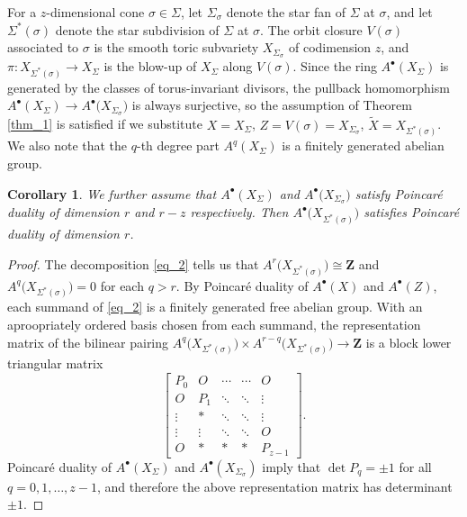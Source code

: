\documentclass[a4paper,final,oneside]{amsart}
\theoremstyle{definition}
\theoremstyle{plain}
\newtheorem{corollary}[definition]{Corollary}
\theoremstyle{remark}
\begin{document}
For a \(z\)-dimensional cone \(\sigma \in \Sigma\), let \(\Sigma_{\sigma}\) denote the star fan of \(\Sigma\) at \(\sigma\), and let \(\Sigma^*(\sigma)\) denote the star subdivision of \(\Sigma\) at \(\sigma\).
The orbit closure \(V(\sigma)\) associated to \(\sigma\) is the smooth toric subvariety \(X_{\Sigma_{\sigma}}\) of codimension \(z\), and \(\pi\colon X_{\Sigma^*(\sigma)}\to X_{\Sigma}\) is the blow-up of \(X_{\Sigma}\) along \(V(\sigma)\).
Since the ring \(A^{\bullet}(X_{\Sigma})\) is generated by the classes of torus-invariant divisors, the pullback homomorphism \(A^{\bullet}(X_{\Sigma}) \to A^{\bullet}\big(X_{\Sigma_{\sigma}}\big)\) is always surjective, so the assumption of Theorem \ref{thm_1} is satisfied if we substitute \(X=X_{\Sigma}\), \(Z=V(\sigma)=X_{\Sigma_{\sigma}}\), \(\widetilde{X}=X_{\Sigma^*(\sigma)}\).
We also note that the \(q\)-th degree part \(A^q(X_{\Sigma})\) is a finitely generated abelian group.
\begin{corollary}\label{cor_1}
We further assume that \(A^{\bullet}(X_{\Sigma})\) and \(A^{\bullet}\big(X_{\Sigma_{\sigma}}\big)\) satisfy Poincar\'e duality of dimension \(r\) and \(r-z\) respectively.
Then \(A^{\bullet}\big(X_{\Sigma^*(\sigma)}\big)\) satisfies Poincar\'e duality of dimension \(r\).
\end{corollary}
\begin{proof}
The decomposition \eqref{eq_2} tells us that \(A^r\big(X_{\Sigma^*(\sigma)}\big)\cong \symbf{Z}\) and \(A^q\big(X_{\Sigma^*(\sigma)}\big)=0\) for each \(q>r\).
By Poincar\'e duality of \(A^{\bullet}(X)\) and \(A^{\bullet}(Z)\), each summand of \eqref{eq_2} is a finitely generated free abelian group.
With an aproopriately ordered basis chosen from each summand, the representation matrix of the bilinear pairing \(A^q\big(X_{\Sigma^*(\sigma)}\big)\times A^{r-q}\big(X_{\Sigma^*(\sigma)}\big)\to \symbf{Z}\) is a block lower triangular matrix 
\begin{equation}
\begin{bmatrix}
P_0 & O & \cdots &\cdots &O \\
O& P_1& \ddots& \ddots& \vdots \\
\vdots& \ast& \ddots & \ddots & \vdots\\
\vdots& \vdots& \ddots & \ddots & O\\
O&\ast&\ast&\ast&P_{z-1}
\end{bmatrix}.
\end{equation}
Poincar\'e duality of \(A^{\bullet}(X_{\Sigma})\) and \(A^{\bullet}(X_{\Sigma_{\sigma}})\) imply that \(\det P_q = \pm 1\) for all \(q=0,1,\dotsc,z-1\), and therefore the above representation matrix has determinant \(\pm 1\).
\end{proof}
\clearpage
\end{document}
